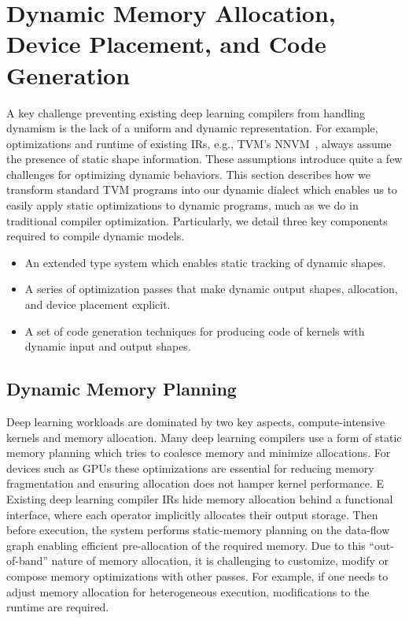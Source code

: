 \section{Dynamic Memory Allocation, Device Placement, and Code Generation}

A key challenge preventing existing deep learning compilers from handling dynamism
  is the lack of a uniform and dynamic representation.
For example, optimizations and runtime of existing IRs,
  e.g., TVM's NNVM~\citep{tvm_osdi18}, always assume the presence of static shape information.
These assumptions introduce quite a few challenges for optimizing dynamic behaviors.
This section describes how we transform standard TVM programs into our dynamic dialect
  which enables us to easily apply static optimizations to dynamic programs, much as we
  do in traditional compiler optimization.
Particularly, we detail three key components required to compile dynamic models.

\begin{itemize}
    \item An extended type system which enables static tracking of dynamic shapes.
    \item A series of optimization passes that make dynamic output shapes, allocation, and device placement explicit.
    \item A set of code generation techniques for producing code of kernels with dynamic input and output shapes.
\end{itemize}

\subsection{Dynamic Memory Planning}
\label{subsec:optimizations:memory}

Deep learning workloads are dominated by two key aspects,
  compute-intensive kernels and memory allocation.
Many deep learning compilers use a form of static memory planning which tries to
  coalesce memory and minimize allocations.
For devices such as GPUs these optimizations are essential for reducing memory fragmentation and ensuring allocation
  does not hamper kernel performance. E
Existing deep learning compiler IRs hide memory allocation behind a functional interface,
  where each operator implicitly allocates their output storage.
Then before execution, the system performs static-memory planning on the data-flow graph enabling efficient pre-allocation of the required memory. Due to this ``out-of-band'' nature of memory allocation, it is challenging to customize, modify or compose memory optimizations with other passes. For example, if one needs to adjust memory allocation for heterogeneous execution, modifications to the runtime are required.

